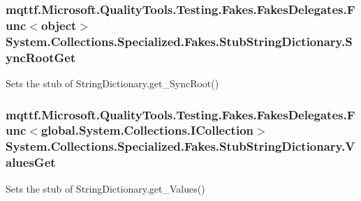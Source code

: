 \hypertarget{class_system_1_1_collections_1_1_specialized_1_1_fakes_1_1_stub_string_dictionary_a7bbdf86948eb72d21b0e8bf3d8e3b9a6}{
\subsubsection[{Sync\-Root\-Get}]{\setlength{\rightskip}{0pt plus 5cm}mqttf.\-Microsoft.\-Quality\-Tools.\-Testing.\-Fakes.\-Fakes\-Delegates.\-Func$<$object$>$ System.\-Collections.\-Specialized.\-Fakes.\-Stub\-String\-Dictionary.\-Sync\-Root\-Get}}\label{class_system_1_1_collections_1_1_specialized_1_1_fakes_1_1_stub_string_dictionary_a7bbdf86948eb72d21b0e8bf3d8e3b9a6}


Sets the stub of String\-Dictionary.\-get\-\_\-\-Sync\-Root()

\hypertarget{class_system_1_1_collections_1_1_specialized_1_1_fakes_1_1_stub_string_dictionary_a826e0ba75586b2236a1bb228588adbda}{
\subsubsection[{Values\-Get}]{\setlength{\rightskip}{0pt plus 5cm}mqttf.\-Microsoft.\-Quality\-Tools.\-Testing.\-Fakes.\-Fakes\-Delegates.\-Func$<$global.\-System.\-Collections.\-I\-Collection$>$ System.\-Collections.\-Specialized.\-Fakes.\-Stub\-String\-Dictionary.\-Values\-Get}}\label{class_system_1_1_collections_1_1_specialized_1_1_fakes_1_1_stub_string_dictionary_a826e0ba75586b2236a1bb228588adbda}


Sets the stub of String\-Dictionary.\-get\-\_\-\-Values()



